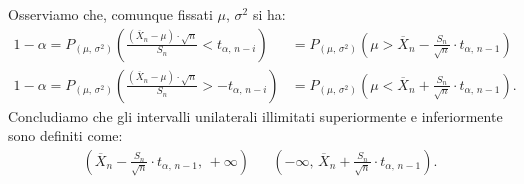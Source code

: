             \begin{prty}[Intervallo unilaterale con $\mu =\,?,\, \sigma^2 =\,?$]
                Osserviamo che, comunque fissati $\mu,\, \sigma^2$ si ha:
                \begin{align*}
                    1-\alpha = P_{(\mu,\, \sigma^2)}\left(\frac{(\overline{X}_n -\mu)\cdot \sqrt{n}}{S_n} 
                    < t_{\alpha,\,n-i}\right)
                    &= P_{(\mu,\, \sigma^2)}\left(\mu > \overline{X}_n -\frac{S_n}{\sqrt{n}}\cdot t_{\alpha,\,n-1}\right) \\
                    1-\alpha = P_{(\mu,\, \sigma^2)}\left(\frac{(\overline{X}_n -\mu)\cdot \sqrt{n}}{S_n} 
                    > -t_{\alpha,\,n-i}\right)
                    &= P_{(\mu,\, \sigma^2)}\left(\mu < \overline{X}_n +\frac{S_n}{\sqrt{n}}\cdot t_{\alpha,\,n-1}\right)
                .\end{align*}
                Concludiamo che gli intervalli unilaterali illimitati superiormente e inferiormente sono 
                definiti come:
                \begin{align*}
                    \left(\overline{X}_n -\frac{S_n}{\sqrt{n}}\cdot t_{\alpha,\,n-1},\, +\infty\right) & &
                    \left(-\infty,\, \overline{X}_n +\frac{S_n}{\sqrt{n}}\cdot t_{\alpha,\,n-1}\right)
                .\end{align*}
            \end{prty}
